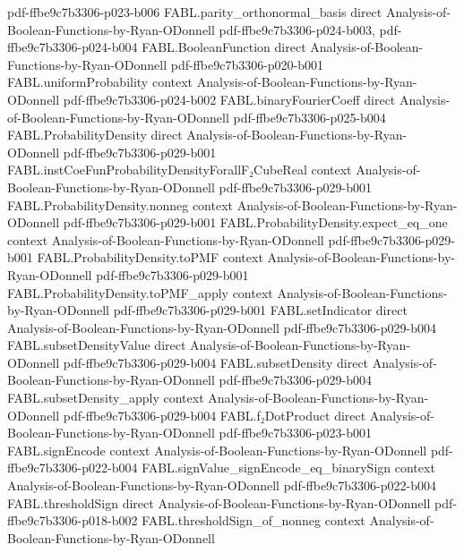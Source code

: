 \begin{theorem}
  {pdf-ffbe9c7b3306-p023-b006}
\proofstep
  {FABL.parity_orthonormal_basis}
  {direct}
  {Analysis-of-Boolean-Functions-by-Ryan-ODonnell}
  {pdf-ffbe9c7b3306-p024-b003,
    pdf-ffbe9c7b3306-p024-b004}
\proofstep
  {FABL.BooleanFunction}
  {direct}
  {Analysis-of-Boolean-Functions-by-Ryan-ODonnell}
  {pdf-ffbe9c7b3306-p020-b001}
\proofstep
  {FABL.uniformProbability}
  {context}
  {Analysis-of-Boolean-Functions-by-Ryan-ODonnell}
  {pdf-ffbe9c7b3306-p024-b002}
\proofstep
  {FABL.binaryFourierCoeff}
  {direct}
  {Analysis-of-Boolean-Functions-by-Ryan-ODonnell}
  {pdf-ffbe9c7b3306-p025-b004}
\proofstep
  {FABL.ProbabilityDensity}
  {direct}
  {Analysis-of-Boolean-Functions-by-Ryan-ODonnell}
  {pdf-ffbe9c7b3306-p029-b001}
\proofstep
  {FABL.instCoeFunProbabilityDensityForallF₂CubeReal}
  {context}
  {Analysis-of-Boolean-Functions-by-Ryan-ODonnell}
  {pdf-ffbe9c7b3306-p029-b001}
\proofstep
  {FABL.ProbabilityDensity.nonneg}
  {context}
  {Analysis-of-Boolean-Functions-by-Ryan-ODonnell}
  {pdf-ffbe9c7b3306-p029-b001}
\proofstep
  {FABL.ProbabilityDensity.expect_eq_one}
  {context}
  {Analysis-of-Boolean-Functions-by-Ryan-ODonnell}
  {pdf-ffbe9c7b3306-p029-b001}
\proofstep
  {FABL.ProbabilityDensity.toPMF}
  {context}
  {Analysis-of-Boolean-Functions-by-Ryan-ODonnell}
  {pdf-ffbe9c7b3306-p029-b001}
\proofstep
  {FABL.ProbabilityDensity.toPMF_apply}
  {context}
  {Analysis-of-Boolean-Functions-by-Ryan-ODonnell}
  {pdf-ffbe9c7b3306-p029-b001}
\proofstep
  {FABL.setIndicator}
  {direct}
  {Analysis-of-Boolean-Functions-by-Ryan-ODonnell}
  {pdf-ffbe9c7b3306-p029-b004}
\proofstep
  {FABL.subsetDensityValue}
  {direct}
  {Analysis-of-Boolean-Functions-by-Ryan-ODonnell}
  {pdf-ffbe9c7b3306-p029-b004}
\proofstep
  {FABL.subsetDensity}
  {direct}
  {Analysis-of-Boolean-Functions-by-Ryan-ODonnell}
  {pdf-ffbe9c7b3306-p029-b004}
\proofstep
  {FABL.subsetDensity_apply}
  {context}
  {Analysis-of-Boolean-Functions-by-Ryan-ODonnell}
  {pdf-ffbe9c7b3306-p029-b004}
\proofstep
  {FABL.f₂DotProduct}
  {direct}
  {Analysis-of-Boolean-Functions-by-Ryan-ODonnell}
  {pdf-ffbe9c7b3306-p023-b001}
\proofstep
  {FABL.signEncode}
  {context}
  {Analysis-of-Boolean-Functions-by-Ryan-ODonnell}
  {pdf-ffbe9c7b3306-p022-b004}
\proofstep
  {FABL.signValue_signEncode_eq_binarySign}
  {context}
  {Analysis-of-Boolean-Functions-by-Ryan-ODonnell}
  {pdf-ffbe9c7b3306-p022-b004}
\proofstep
  {FABL.thresholdSign}
  {direct}
  {Analysis-of-Boolean-Functions-by-Ryan-ODonnell}
  {pdf-ffbe9c7b3306-p018-b002}
\proofstep
  {FABL.thresholdSign_of_nonneg}
  {context}
  {Analysis-of-Boolean-Functions-by-Ryan-ODonnell}

\end{theorem}

